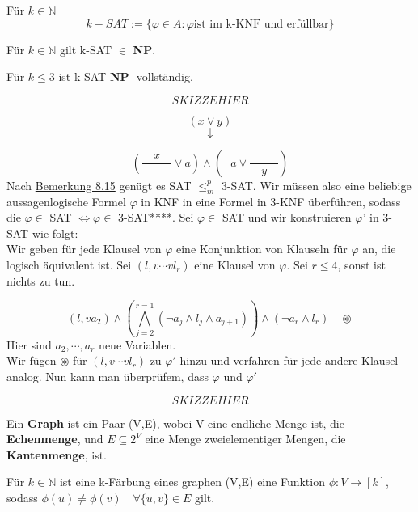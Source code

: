     Für \(k \in \mathbb{N}\)
    \[
        k-SAT := \{ \varphi \in A : \varphi \text{ist im k-KNF und erfüllbar}\}     
    \]

    Für \(k \in \mathbb{N}\) gilt k-SAT \(\in\) \textbf{NP}.

    Für \(k \leq 3\) ist k-SAT \textbf{NP}- vollständig.

    \[SKIZZE HIER\]

    \[
        (x \vee y )
    \]
    \[
        \downarrow
    \]

    \[
        (\frac{\quad x \quad }{} \vee a) \wedge (\lnot a \vee \frac{}{\quad y \quad})
    \]
    Nach \hyperref[subsec:8.15]{Bemerkung 8.15} genügt es SAT \( \leq^p_m\) 3-SAT. Wir müssen also eine beliebige aussagenlogische Formel \(\varphi\) in KNF in eine Formel in 3-KNF überführen, sodass die \(\varphi \in\) SAT \(\Leftrightarrow \varphi \in\) 3-SAT****. Sei \(\varphi \in\) SAT und wir konstruieren \(\varphi\)' in 3-SAT wie folgt:
    \vspace*{0.5cm}
    \\
    Wir geben für jede Klausel von \(\varphi\) eine Konjunktion von Klauseln für \(\varphi\) an, die logisch äquivalent ist. Sei \((l,v \cdots vl_r)\) eine Klausel von \(\varphi\). Sei \(r \leq 4\), sonst ist nichts zu tun.
    
    \[
        (l, va_2) \wedge (\bigwedge \limits_{j = 2}^{r = 1} (\lnot a_j \wedge l_j \wedge a_{j+1})) \wedge (\lnot a_r \wedge l_r)  \quad \circledast 
    \]
    Hier sind \(a_2, \cdots, a_r\) neue Variablen. 
    \vspace*{0.5cm}
    \\
    Wir fügen \(\circledast\) für \((l, v \cdots vl_r)\) zu \(\varphi'\) hinzu und verfahren für jede andere Klausel analog. Nun kann man überprüfem, dass \(\varphi\) und \(\varphi '\)

    \[SKIZZE HIER\]

    Ein \textbf{Graph} ist ein Paar (V,E), wobei V eine endliche Menge ist, die \textbf{Echenmenge}, und \(E \subseteq 2^V\) eine Menge zweielementiger Mengen, die \textbf{Kantenmenge}, ist.

    Für \(k \in \mathbb{N}\) ist eine k-Färbung eines graphen (V,E) eine Funktion \(\phi : V \to [k]\), sodass \(\phi(u) \not = \phi(v) \quad \forall \{u, v\} \in E\) gilt.

